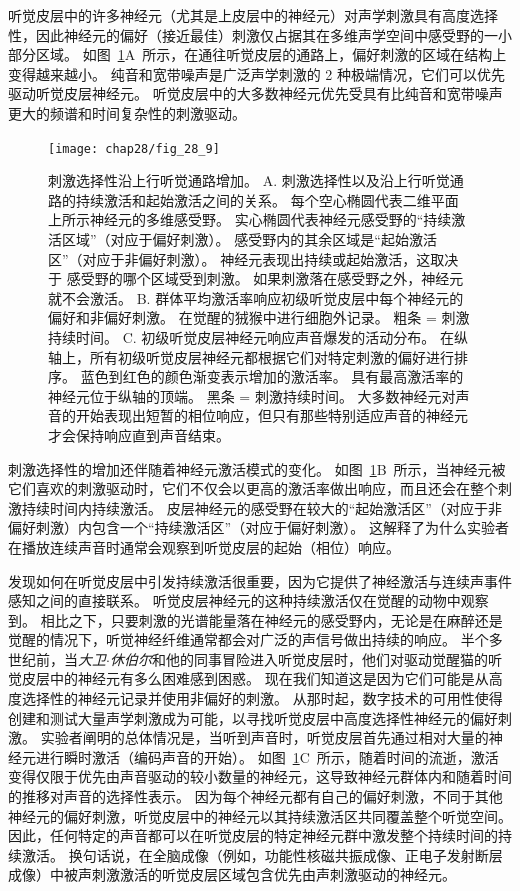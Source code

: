 听觉皮层中的许多神经元（尤其是上皮层中的神经元）对声学刺激具有高度选择性，因此神经元的偏好（接近最佳）刺激仅占据其在多维声学空间中感受野的一小部分区域。
如图~\ref{fig:28_9}A~所示，在通往听觉皮层的通路上，偏好刺激的区域在结构上变得越来越小。
纯音和宽带噪声是广泛声学刺激的 2 种极端情况，它们可以优先驱动听觉皮层神经元。
听觉皮层中的大多数神经元优先受具有比纯音和宽带噪声更大的频谱和时间复杂性的刺激驱动。


\begin{figure}[htbp]
	\centering
	\texttt{[image: chap28/fig\_28\_9]}
	\caption{刺激选择性沿上行听觉通路增加。
		A. 刺激选择性以及沿上行听觉通路的持续激活和起始激活之间的关系。
		每个空心椭圆代表二维平面上所示神经元的多维感受野。
		实心椭圆代表神经元感受野的“持续激活区域”（对应于偏好刺激）。
		感受野内的其余区域是“起始激活区”（对应于非偏好刺激）。
		神经元表现出持续或起始激活，这取决于 感受野的哪个区域受到刺激。
		如果刺激落在感受野之外，神经元就不会激活\cite{wang2018cortical}。
		B. 群体平均激活率响应初级听觉皮层中每个神经元的偏好和非偏好刺激。
		在觉醒的狨猴中进行细胞外记录。
		粗条 = 刺激持续时间\cite{wang2005sustained}。
		C. 初级听觉皮层神经元响应声音爆发的活动分布。
		在纵轴上，所有初级听觉皮层神经元都根据它们对特定刺激的偏好进行排序。
		蓝色到红色的颜色渐变表示增加的激活率。
		具有最高激活率的神经元位于纵轴的顶端。
		黑条 = 刺激持续时间。
		大多数神经元对声音的开始表现出短暂的相位响应，但只有那些特别适应声音的神经元才会保持响应直到声音结束\cite{middlebrooks2005auditory}。 }
	\label{fig:28_9}
\end{figure}


刺激选择性的增加还伴随着神经元激活模式的变化。
如图~\ref{fig:28_9}B~所示，当神经元被它们喜欢的刺激驱动时，它们不仅会以更高的激活率做出响应，而且还会在整个刺激持续时间内持续激活。
皮层神经元的感受野在较大的“起始激活区”（对应于非偏好刺激）内包含一个“持续激活区”（对应于偏好刺激）。 
这解释了为什么实验者在播放连续声音时通常会观察到听觉皮层的起始（相位）响应。


发现如何在听觉皮层中引发持续激活很重要，因为它提供了神经激活与连续声事件感知之间的直接联系。
听觉皮层神经元的这种持续激活仅在觉醒的动物中观察到。
相比之下，只要刺激的光谱能量落在神经元的感受野内，无论是在麻醉还是觉醒的情况下，听觉神经纤维通常都会对广泛的声信号做出持续的响应。
半个多世纪前，当\textit{大卫$\cdot$休伯尔}和他的同事冒险进入听觉皮层时，他们对驱动觉醒猫的听觉皮层中的神经元有多么困难感到困惑。
现在我们知道这是因为它们可能是从高度选择性的神经元记录并使用非偏好的刺激。
从那时起，数字技术的可用性使得创建和测试大量声学刺激成为可能，以寻找听觉皮层中高度选择性神经元的偏好刺激。
实验者阐明的总体情况是，当听到声音时，听觉皮层首先通过相对大量的神经元进行瞬时激活（编码声音的开始）。
如图~\ref{fig:28_9}C~所示，随着时间的流逝，激活变得仅限于优先由声音驱动的较小数量的神经元，这导致神经元群体内和随着时间的推移对声音的选择性表示。
因为每个神经元都有自己的偏好刺激，不同于其他神经元的偏好刺激，听觉皮层中的神经元以其持续激活区共同覆盖整个听觉空间。
因此，任何特定的声音都可以在听觉皮层的特定神经元群中激发整个持续时间的持续激活。
换句话说，在全脑成像（例如，功能性核磁共振成像、正电子发射断层成像）中被声刺激激活的听觉皮层区域包含优先由声刺激驱动的神经元。



